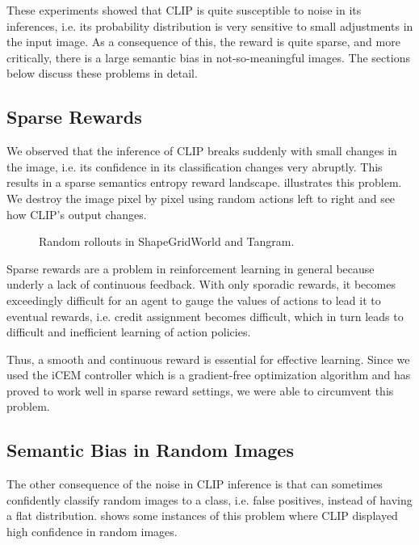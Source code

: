These experiments showed that CLIP is quite susceptible to noise in its inferences, i.e. its probability distribution is very sensitive to small adjustments in the input image.
As a consequence of this, the reward is quite sparse, and more critically, there is a large semantic bias in not-so-meaningful images.
The sections below discuss these problems in detail.

\subsection{Sparse Rewards} %
\label{sec:sparse-rewards}

We observed that the inference of CLIP breaks suddenly with small changes in the image, i.e. its confidence in its classification changes very abruptly.
This results in a sparse semantics entropy reward landscape.
 illustrates this problem.
We destroy the image pixel by pixel using random actions left to right and see how CLIP's output changes.

\begin{figure}[h]
    \centering
    \caption{Random rollouts in ShapeGridWorld and Tangram.}
    \label{fig:sparse-rewards}
\end{figure}

Sparse rewards are a problem in reinforcement learning in general because underly a lack of continuous feedback. 
With only sporadic rewards, it becomes exceedingly difficult for an agent to gauge the values of actions to lead it to eventual rewards, i.e. credit assignment becomes difficult, which in turn leads to difficult and inefficient learning of action policies.


Thus, a smooth and continuous reward is essential for effective learning.
Since we used the iCEM controller which is a gradient-free optimization algorithm and has proved to work well in sparse reward settings, we were able to circumvent this problem.

\subsection{Semantic Bias in Random Images} %
\label{sec:inference-noise}
The other consequence of the noise in CLIP inference is that can sometimes confidently classify random images to a class, i.e. false positives, instead of having a flat distribution.
 shows some instances of this problem where CLIP displayed high confidence in random images.


